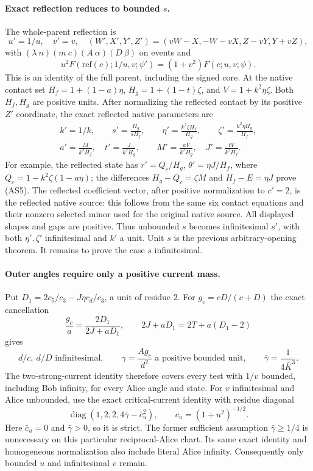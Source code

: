 \paragraph{Exact reflection reduces to bounded $s$.}
The whole-parent reflection is
\[
 u'=1/u,\quad v'=v,\quad
 (W',X',Y',Z')=(vW-X,-W-vX,Z-vY,Y+vZ),
 \tag{AS3}
\]
with $(\lambda\ n)(m\ c)(A\ \alpha)(D\ \beta)$ on events and
\[
 u^2F(\mathrm{ref}(c);1/u,v;\psi')=(1+v^2)F(c;u,v;\psi).
 \tag{AS4}
\]
This is an identity of the full parent, including the signed core.
At the native contact set
$H_f=1+(1-a)\eta$, $H_g=1+(1-t)\zeta$, and
$V=1+k^2\eta\zeta$. Both $H_f,H_g$ are positive units. After
normalizing the reflected contact by its positive $Z'$ coordinate,
the exact reflected native parameters are
\[
\begin{gathered}
 k'=1/k,\qquad s'=\frac{H_g}{sH_f},\qquad
 \eta'=\frac{k^2\zeta H_f}{H_g},\qquad
 \zeta'=\frac{k^2\eta H_g}{H_f},\\
 a'=\frac{M}{k^2H_f},\quad t'=\frac{J}{k^2H_g},\qquad
 M'=\frac{aV}{k^2H_g},\quad J'=\frac{tV}{k^2H_f}.
\end{gathered}\tag{AS5}
\]
For example, the reflected state has
$r'=Q_c/H_g$, $\theta'=\eta J/H_f$, where
$Q_c=1-k^2\zeta(1-a\eta)$; the differences
$H_g-Q_c=\zeta M$ and $H_f-E=\eta J$ prove (AS5).
The reflected coefficient vector, after positive normalization to
$c'=2$, is the reflected native source: this follows from the same
six contact equations and their nonzero selected minor used for the
original native source. All displayed shapes and gaps are positive.
Thus unbounded $s$ becomes infinitesimal $s'$, with both
$\eta',\zeta'$ infinitesimal and $k'$ a unit. Unit $s$ is the
previous arbitrary-opening theorem. It remains to prove the case
$s$ infinitesimal.

\paragraph{Outer angles require only a positive current mass.}
Put $D_1=2c_5/c_3-J\eta c_d/c_3$, a unit of residue $2$.
For $g_c=cD/(c+D)$ the exact cancellation
\[
 \frac{g_c}{a}=\frac{2D_1}{2J+aD_1},\qquad
 2J+aD_1=2T+a(D_1-2)
 \tag{AS6}
\]
gives
\[
 d/c,\ d/D\text{ infinitesimal},\qquad
 \gamma=\frac{Ag_c}{d^2}\text{ a positive bounded unit},
 \qquad\bar\gamma=\frac1{4\bar K^3}.
 \tag{AS7}
\]
The two-strong-current identity therefore covers every test with
$1/v$ bounded, including Bob infinity, for every Alice angle and state.
For $v$ infinitesimal and Alice unbounded, use the exact critical-current
identity with residue diagonal
\[
 \operatorname{diag}(1,2,2,4\bar\gamma-\bar c_u^2),
 \qquad c_u=(1+u^2)^{-1/2}.
 \tag{AS8}
\]
Here $\bar c_u=0$ and $\bar\gamma>0$, so it is strict.
The former sufficient assumption $\bar\gamma\ge1/4$ is unnecessary
on this particular reciprocal-Alice chart. Its same exact identity
and homogeneous normalization also include literal Alice infinity.
Consequently only bounded $u$ and infinitesimal $v$ remain.

